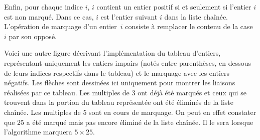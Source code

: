 \documentclass[a4paper]{easychair}
\newcommand\arri[1]{\ocamlf{arr[}#1\ocamlf{]}}
\begin{document}
Enfin, pour chaque indice $i$, \arri{$i$} contient un entier positif
si et seulement si l'entier $i$ est non marqué.
Dans ce cas, \arri{$i$} est l'entier suivant $i$ dans la liste chaînée.
L'opération de marquage d'un entier~$i$ consiste à remplacer le
contenu de la case~$i$ par son opposé.

Voici une autre figure décrivant l'implémentation du tableau d'entiers,
représentant uniquement les entiers impairs (notés entre parenthèses, en
dessous de leurs indices respectifs dans le tableau) et le marquage avec
les entiers négatifs.
Les flèches sont dessinées ici uniquement pour montrer les liaisons
réalisées par ce tableau.
Les multiples de $3$ ont
déjà été marqués et ceux qui se trouvent dans la portion du tableau
représentée
ont été éliminés de la liste chaînée.
Les multiples de $5$ sont en cours de marquage.
On peut en effet constater que $25$ a été marqué mais pas encore éliminé de
la liste chaînée. Il le sera lorsque l'algorithme marquera $5 \times 25$.
\end{document}
